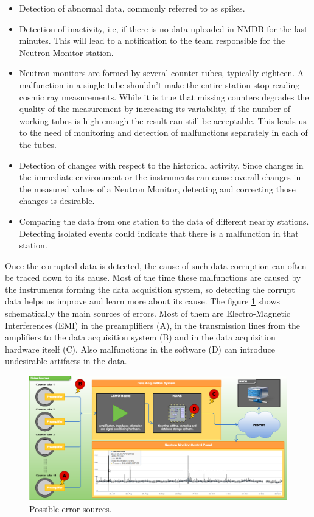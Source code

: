 \documentclass[a4paper]{jpconf}
\begin{document}
\begin{itemize}
	\item Detection of abnormal data, commonly referred to as spikes.
    \item Detection of inactivity, i.e, if there is no data uploaded in NMDB for
        the last minutes. This will lead to a notification to the team
        responsible for the Neutron Monitor station. 
    \item Neutron monitors are formed by several counter tubes, typically
        eighteen. A malfunction in a single tube shouldn't make the entire
        station stop reading cosmic ray measurements. While it is true that
        missing counters degrades the quality of the measurement by increasing its
        variability, if the number of working tubes is high enough the result can
        still be acceptable. This leads us to the need of monitoring and
        detection of malfunctions separately in each of the tubes.  
    \item Detection of changes with respect to the historical activity.
        Since changes in the immediate environment or the instruments can cause
        overall changes in the measured values of a Neutron Monitor, detecting
        and correcting those changes is desirable.
    \item Comparing the data from one station to the data of different nearby
        stations. Detecting isolated events could indicate that there is a
        malfunction in that station.	
\end{itemize}

Once the corrupted data is detected, the cause of such data corruption can
often be traced down to its cause. Most of the time these malfunctions are
caused by the instruments forming the data acquisition system, so detecting the
corrupt data helps us improve and learn more about its cause. The figure
\ref{fig:NoisePoints} shows schematically the main sources of errors. Most of
them are Electro-Magnetic Interferences (EMI) in the preamplifiers (A), in the
transmission lines from the amplifiers to the data acquisition system (B) and in
the data acquisition hardware itself (C). Also malfunctions in the software (D)
can introduce undesirable artifacts in the data.

\begin{figure}[ht]
    \centering
    \includegraphics[keepaspectratio, width=1\textwidth]{./resources/NoisePoints.png}
    \caption{Possible error sources.}
    \label{fig:NoisePoints}
\end{figure}
\end{document}
